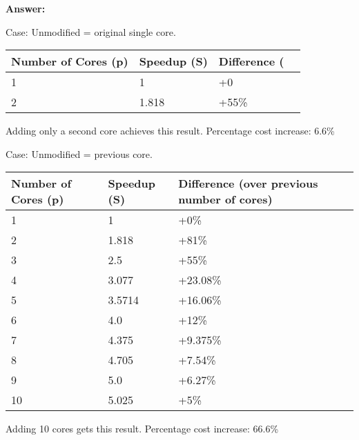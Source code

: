 \documentclass[letterpaper,10pt,onecolumn,titlepage]{article}
\begin{document}
\begin{enumerate}
\textbf{Answer:} 

Case: Unmodified = original single core.

\begin{tabular}{| l | l | l | l |}
    \hline
    Number of Cores (p) & Speedup (S) & Difference (\\ \hline
    1 & 1 & +0\\ \hline
    2 & 1.818 & +55\%\\ \hline
\end{tabular}

Adding only a second core achieves this result.
Percentage cost increase: 6.6\%


Case: Unmodified = previous core.

\begin{tabular}{| l | l | l | l |}
    \hline
    Number of Cores (p) & Speedup (S) & Difference (over previous number of cores)\\ \hline
    1 & 1 & +0\%\\ \hline
    2 & 1.818 & +81\%\\ \hline
    3 & 2.5 & +55\%\\ \hline
    4 & 3.077 & +23.08\%\\ \hline
    5 & 3.5714 & +16.06\%\\ \hline
    6 & 4.0 & +12\%\\ \hline
    7 & 4.375 & +9.375\%\\ \hline
    8 & 4.705 & +7.54\%\\ \hline
    9 & 5.0 & +6.27\%\\ \hline
    10 & 5.025 & +5\%\\ \hline

\end{tabular}
    
    Adding 10 cores gets this result.
    Percentage cost increase: 66.6\%

\end{enumerate}
\end{document}
